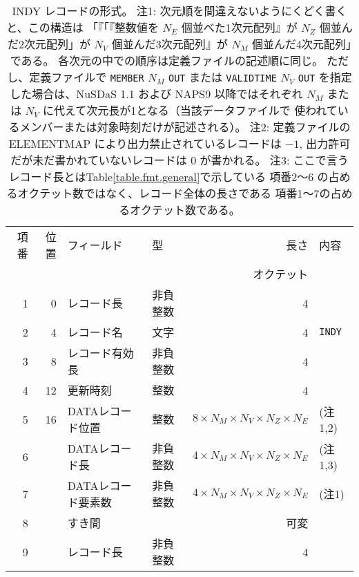 \begin{table}[htp]
 \begin{center}
 \begin{tabular}{rr|llrl}
 \hline
 項番 & 位置 & フィールド & 型 & 長さ & 内容 \\
      &      &            & \multicolumn{2}{r}{オクテット} &  \\
 \hline
 1 & 0 & レコード長 & 非負整数 & 4 & \\
 2 & 4 & レコード名 & 文字 & 4 & {\tt INDY} \\
 3 & 8 & レコード有効長 & 非負整数 & 4 & \\
 4 & 12 & 更新時刻 & 整数 & 4 & \\
 \hline
 5 & 16 & DATAレコード位置 & 整数 &
 	\(8\times N_M\times N_V\times N_Z\times N_E\) & (注1,2) \\
 6 &    & DATAレコード長 & 非負整数 &
 	\(4\times N_M\times N_V\times N_Z\times N_E\) & (注1,3) \\
 7 &    & DATAレコード要素数 & 非負整数 &
 	\(4\times N_M\times N_V\times N_Z\times N_E\) & (注1) \\
 \hline
 8 &  & すき間 & & 可変 &  \\
 9 &  & レコード長 & 非負整数 & 4 &  \\
 \hline
 \end{tabular}
 \end{center}
 \caption[INDY レコードの形式]{%
  INDY レコードの形式。
  注1:
  次元順を間違えないようにくどく書くと、この構造は
  「『「『整数値を \(N_E\) 個並べた1次元配列』が
  \(N_Z\) 個並んだ2次元配列」が
  \(N_V\) 個並んだ3次元配列』が
  \(N_M\) 個並んだ4次元配列」である。
  各次元の中での順序は定義ファイルの記述順に同じ。
  ただし、定義ファイルで
  {\tt MEMBER} \(N_M\) {\tt OUT} または
  {\tt VALIDTIME} \(N_V\) {\tt OUT}
  を指定した場合は、NuSDaS 1.1 および NAPS9 以降ではそれぞれ
  \(N_M\) または \(N_V\) に代えて次元長が1となる（当該データファイルで
  使われているメンバーまたは対象時刻だけが記述される）。 
  注2:
  定義ファイルの ELEMENTMAP により出力禁止されているレコードは $-1$,
  出力許可だが未だ書かれていないレコードは $0$ が書かれる。
  注3:
  ここで言うレコード長とはTable\ref{table.fmt.general}で示している
  項番2〜6 の占めるオクテット数ではなく、レコード全体の長さである
  項番1～7の占めるオクテット数である。
 }
 \label{table.fmt.indy}
\end{table}

